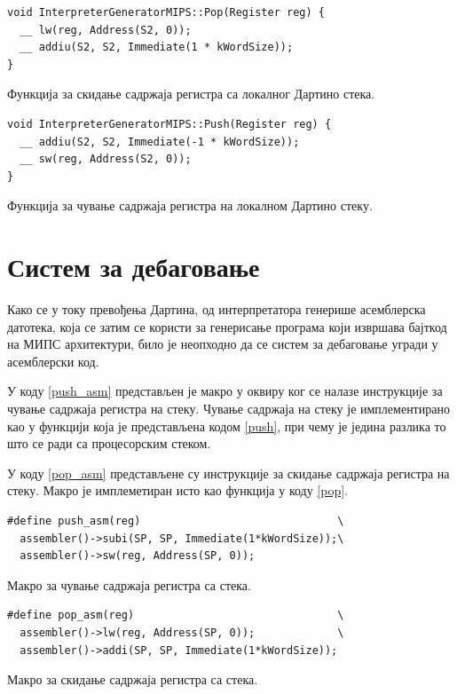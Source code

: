 \documentclass[12pt,oneside]{memoir}
\begin{document}
\begin{listing}
\begin{verbatim}
void InterpreterGeneratorMIPS::Pop(Register reg) {
  __ lw(reg, Address(S2, 0));
  __ addiu(S2, S2, Immediate(1 * kWordSize));
}
\end{verbatim}
\caption{Функција за скидање садржаја регистра са локалног Дартино стека.}
\label{pop}
\end{listing}

\begin{listing}
\begin{verbatim}
void InterpreterGeneratorMIPS::Push(Register reg) {
  __ addiu(S2, S2, Immediate(-1 * kWordSize));
  __ sw(reg, Address(S2, 0));
}
\end{verbatim}
\caption{Функција за чување садржаја регистра на локалном Дартино стеку.}
\label{push}
\end{listing}

\section{Систем за дебаговање}
\label{sec:debagovanje}
Како се у току превођења Дартина, од интерпретатора генерише асемблерска датотека, која се затим се користи за генерисање програма који извршава бајткод на МИПС архитектури, било је неопходно да се систем за дебаговање угради у асемблерски код.

У коду \ref{push_asm} представљен је макро у оквиру ког се налазе инструкције за чување садржаја регистра на стеку. Чување садржаја на стеку је имплементирано као у функцији која је представљена кодом \ref{push}, при чему је једина разлика то што се ради са процесорским стеком.

У коду \ref{pop_asm} представљене су инструкције за скидање садржаја регистра на стеку. Макро је имплеметиран исто као функција у коду \ref{pop}. 

\begin{listing}
\begin{verbatim}
#define push_asm(reg)                               \
  assembler()->subi(SP, SP, Immediate(1*kWordSize));\
  assembler()->sw(reg, Address(SP, 0));
\end{verbatim}
\caption{Макро за чување садржаја регистра са стека.}
\label{push_asm}
\end{listing}

\begin{listing}
\begin{verbatim}
#define pop_asm(reg)                                \
  assembler()->lw(reg, Address(SP, 0));             \
  assembler()->addi(SP, SP, Immediate(1*kWordSize));
\end{verbatim}
\caption{Макро за скидање садржаја регистра са стека.}
\label{pop_asm}
\end{listing}
\end{document}
